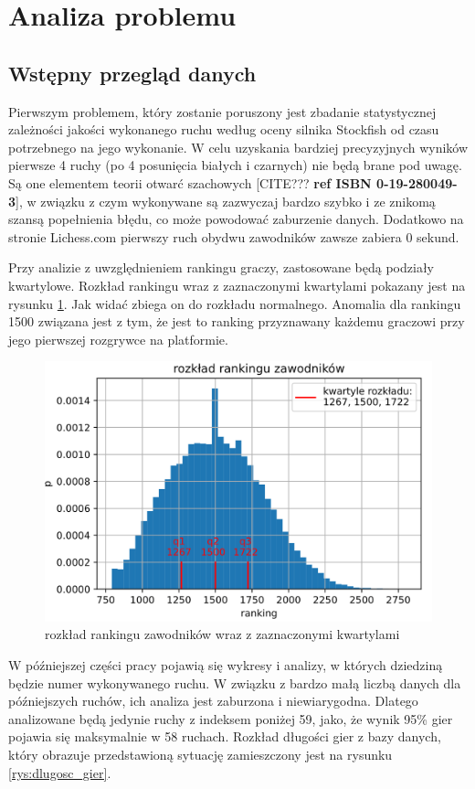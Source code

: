 \documentclass[inzynierska]{pwr_wmat_praca_dyplomowa}
\theoremstyle{plain}
\numberwithin{theorem}{chapter}
\theoremstyle{definition}
\numberwithin{theorem}{chapter}
\begin{document}
\section{Analiza problemu}

\subsection{Wstępny przegląd danych}



Pierwszym problemem, który zostanie poruszony jest zbadanie statystycznej zależności jakości wykonanego ruchu według oceny silnika Stockfish od czasu potrzebnego na jego wykonanie. W celu uzyskania bardziej precyzyjnych wyników pierwsze 4 ruchy (po 4 posunięcia białych i czarnych) nie będą brane pod uwagę. Są one elementem teorii otwarć szachowych [CITE??? \textbf{ref ISBN 0-19-280049-3}], w związku z czym wykonywane są zazwyczaj bardzo szybko i ze znikomą szansą popełnienia błędu, co może powodować zaburzenie danych. Dodatkowo na stronie Lichess.com pierwszy ruch obydwu zawodników zawsze zabiera 0 sekund.

Przy analizie z uwzględnieniem rankingu graczy, zastosowane będą podziały kwartylowe. Rozkład rankingu wraz z zaznaczonymi kwartylami pokazany jest na rysunku \ref{rys:rozklad_elo}. Jak widać zbiega on do rozkładu normalnego. Anomalia dla rankingu 1500 związana jest z tym, że jest to ranking przyznawany każdemu graczowi przy jego pierwszej rozgrywce na platformie.
\begin{figure}[H]
	\centering
	\includegraphics[width=\textwidth]{ranking.png}
	\caption{rozkład rankingu zawodników wraz z zaznaczonymi kwartylami}
	\label{rys:rozklad_elo}
\end{figure}
W późniejszej części pracy pojawią się wykresy i analizy, w których dziedziną będzie numer wykonywanego ruchu. W związku z bardzo małą liczbą danych dla późniejszych ruchów, ich analiza jest zaburzona i niewiarygodna. Dlatego analizowane będą jedynie ruchy z indeksem poniżej 59, jako, że wynik 95\% gier pojawia się maksymalnie w 58 ruchach. Rozkład długości gier z bazy danych, który obrazuje przedstawioną sytuację zamieszczony jest na rysunku \ref{rys:dlugosc_gier}.
\end{document}
